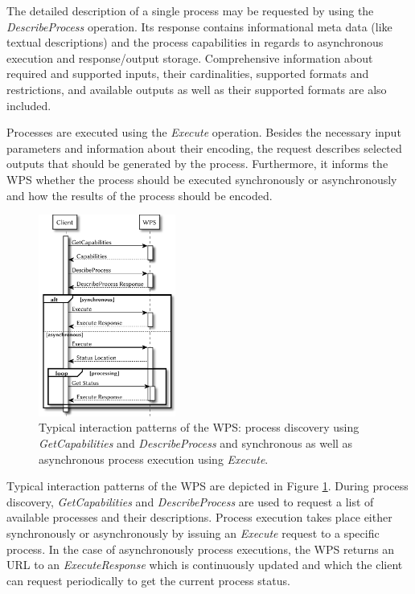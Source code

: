 	The detailed description of a single process may be requested by using the \emph{DescribeProcess} operation. Its response contains informational meta data (like textual descriptions) and the process capabilities in regards to asynchronous execution and response/output storage. Comprehensive information about required and supported inputs, their cardinalities, supported formats and restrictions, and available outputs as well as their supported formats are also included.

	Processes are executed using the \emph{Execute} operation. Besides the necessary input parameters and information about their encoding, the request describes selected outputs that should be generated by the process. Furthermore, it informs the \ac{WPS} whether the process should be executed synchronously or asynchronously and how the results of the process should be encoded.

	\begin{figure}[!htb]
		\centering
		\includegraphics[width=0.40140845070422537\textwidth]{figures/sequence-diagramm-wps.pdf}
		\caption{\label{fig:sd:wps}Typical interaction patterns of the \acl{WPS}: process discovery using \emph{GetCapabilities} and \emph{DescribeProcess} and synchronous as well as asynchronous process execution using \emph{Execute}.}
	\end{figure}

	Typical interaction patterns of the \acl{WPS} are depicted in Figure \ref{fig:sd:wps}. During process discovery, \emph{GetCapabilities} and \emph{DescribeProcess} are used to request a list of available processes and their descriptions. Process execution takes place either synchronously or asynchronously by issuing an \emph{Execute} request to a specific process. In the case of asynchronously process executions, the \ac{WPS} returns an URL to an \emph{ExecuteResponse} which is continuously updated and which the client can request periodically to get the current process status.

